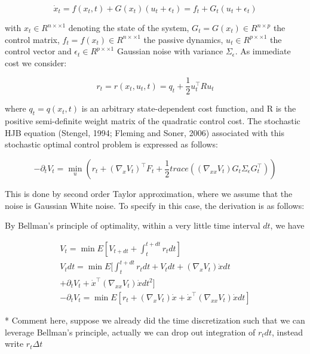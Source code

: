 \documentclass[journal]{IEEEtran}
\begin{document}
\begin{equation}
  \dot{x}_t = f(x_t,t)+G(x_t)(u_t +\epsilon_t) = f_t +G_t (u_t +\epsilon_t)
  \label{dynamicfunc}
\end{equation}

with $x_t \in R^{n×\times 1}$ denoting the state of the system, $G_t = G(x_t ) \in R^{n\times p}$ the control matrix, $f_t = f(x_t ) \in R^{n×\times 1} $ the passive dynamics, $u_t \in R^{p×\times 1}$ the control vector and $\epsilon_t \in R^{p×\times1}$ Gaussian noise with variance $\Sigma_{\epsilon}$. As immediate cost we consider:

\begin{equation}
  r_t = r(x_t,u_t,t) = q_t + \frac{1}{2} u_t^{\top} R u_t
  \label{immediate cost}
\end{equation}

where $q_t = q(x_t,t)$ is an arbitrary state-dependent cost function, and R is the positive semi-definite weight matrix of the quadratic control cost. 
The stochastic HJB equation (Stengel, 1994; Fleming and Soner, 2006) associated with this stochastic optimal control problem is expressed as follows:

\begin{equation}
  -\partial_t V_t = \min_u (r_t + (\nabla_xV_t)^{\top}F_t + \frac{1}{2}trace((\nabla_{xx}V_t)G_t\Sigma_{\epsilon}G_t^{\top}))
  \label{HJB}
\end{equation}

This is done by second order Taylor approximation, where we assume that the noise is Gaussian White noise. To specify in this case, the derivation
is as follows:

By Bellman's principle of optimality, within a very little time interval $dt$, we have

\begin{equation}
  \begin{aligned}
  V_t  = \min E [{V_{t+dt} + \int_{t}^{t+dt} r_t dt}]   \\
  V_t dt  = \min E [\int_{t}^{t+dt} r_t dt+ V_t dt + (\nabla_x V_t)\dot{x} dt  \\ + \partial_tV_t + \dot{x}^{\top}(\nabla_{xx} V_t)\dot{x} dt^2] \nonumber \\
  -\partial_tV_t  = \min E [r_t + (\nabla_x V_t)\dot{x} + \dot{x}^{\top}(\nabla_{xx} V_t)\dot{x} dt]
  \end{aligned}
\end{equation}

* Comment here, suppose we already did the time discretization such that we can leverage Bellman's principle, actually we can drop out integration of $r_t dt$, instead write $r_t \Delta t$ 
\end{document}
